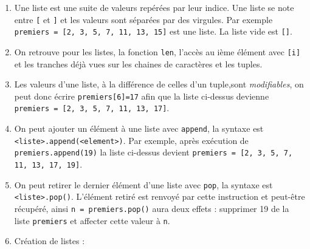 \documentclass[11pt,a4paper]{article}
\begin{document}
\begin{tcolorbox}[left=0cm,title=\bf{\faPython \; Listes},colbacktitle=cfond]
    \begin{enumerate}
        \item[\ding{182}] Une liste est une suite de valeurs repérées par leur indice. Une liste se note entre {\tt [} et {\tt]} et les valeurs sont séparées par des virgules. Par exemple \texttt{premiers = [2, 3, 5, 7, 11, 13, 15]} est une liste. La liste vide est {\tt []}.
        \item[\ding{183}] On retrouve pour les listes, la fonction {\tt len}, l'accès au  ième élément avec {\tt [i]} et les tranches déjà vues sur les chaines de caractères et les tuples.
        \item[\ding{184}] Les valeurs d'une liste, à la différence de celles d'un tuple,sont \textit{modifiables}, on peut donc écrire \texttt{premiers[6]=17} afin que la liste ci-dessus devienne \texttt{premiers = [2, 3, 5, 7, 11, 13, 17]}.
        \item[\ding{185}] On peut ajouter un élément à une liste avec {\tt append}, la syntaxe est {\tt <liste>.append(<element>)}. Par exemple, après exécution de \texttt{premiers.append(19)} la liste ci-dessus devient \texttt{premiers = [2, 3, 5, 7, 11, 13, 17, 19]}.
        \item[\ding{186}] On peut retirer le dernier élément d'une liste avec {\tt pop}, la syntaxe est {\tt <liste>.pop()}. L'élément retiré est renvoyé par cette instruction et peut-être récupéré, ainsi \texttt{n = premiers.pop()} aura deux effets : supprimer 19 de la liste {\tt premiers} et affecter cette valeur à {\tt n}.
        \item[\ding{187}] Création de listes :
    \end{enumerate}
\end{tcolorbox}
\end{document}
